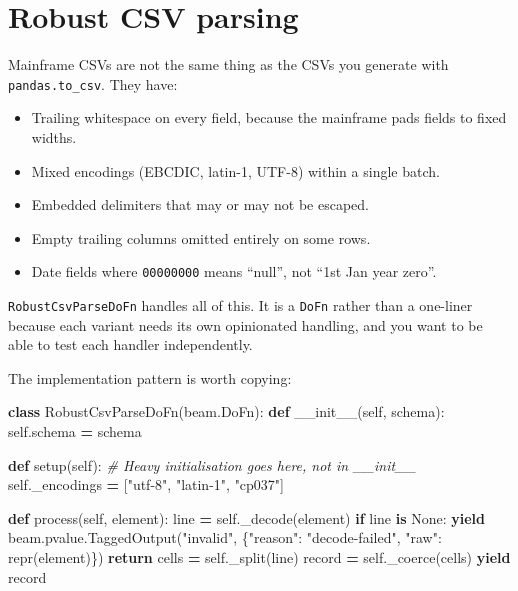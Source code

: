 \documentclass[
  11pt,
  british,
  oneside]{book}
\newenvironment{Shaded}{\begin{snugshade}}{\end{snugshade}}
\newcommand{\BuiltInTok}[1]{#1}
\newcommand{\CommentTok}[1]{\textcolor[rgb]{0.56,0.35,0.01}{\textit{#1}}}
\newcommand{\ControlFlowTok}[1]{\textcolor[rgb]{0.13,0.29,0.53}{\textbf{#1}}}
\newcommand{\FunctionTok}[1]{\textcolor[rgb]{0.00,0.00,0.00}{#1}}
\newcommand{\KeywordTok}[1]{\textcolor[rgb]{0.13,0.29,0.53}{\textbf{#1}}}
\newcommand{\NormalTok}[1]{#1}
\newcommand{\OperatorTok}[1]{\textcolor[rgb]{0.81,0.36,0.00}{\textbf{#1}}}
\newcommand{\StringTok}[1]{\textcolor[rgb]{0.31,0.60,0.02}{#1}}
\newcommand{\VariableTok}[1]{\textcolor[rgb]{0.00,0.00,0.00}{#1}}
\providecommand{\tightlist}{%
  \setlength{\itemsep}{0pt}\setlength{\parskip}{0pt}}
\begin{document}
\hypertarget{robust-csv-parsing}{%
\section{Robust CSV parsing}\label{robust-csv-parsing}}

Mainframe CSVs are not the same thing as the CSVs you generate with
\texttt{pandas.to\_csv}. They have:

\begin{itemize}
\tightlist
\item
  Trailing whitespace on every field, because the mainframe pads fields
  to fixed widths.
\item
  Mixed encodings (EBCDIC, latin-1, UTF-8) within a single
  batch.
\item
  Embedded delimiters that may or may not be escaped.
\item
  Empty trailing columns omitted entirely on some rows.
\item
  Date fields where \texttt{00000000} means ``null'', not ``1st Jan year
  zero''.
\end{itemize}

\texttt{RobustCsvParseDoFn} handles all of this. It is a \texttt{DoFn}
rather than a one-liner because each variant needs its own opinionated
handling, and you want to be able to test each handler independently.

The implementation pattern is worth copying:

\begin{Shaded}
\begin{Highlighting}[]
\KeywordTok{class}\NormalTok{ RobustCsvParseDoFn(beam.DoFn):}
    \KeywordTok{def} \FunctionTok{\_\_init\_\_}\NormalTok{(}\VariableTok{self}\NormalTok{, schema):}
        \VariableTok{self}\NormalTok{.schema }\OperatorTok{=}\NormalTok{ schema}

    \KeywordTok{def}\NormalTok{ setup(}\VariableTok{self}\NormalTok{):}
        \CommentTok{\# Heavy initialisation goes here, not in \_\_init\_\_}
        \VariableTok{self}\NormalTok{.\_encodings }\OperatorTok{=}\NormalTok{ [}\StringTok{"utf{-}8"}\NormalTok{, }\StringTok{"latin{-}1"}\NormalTok{, }\StringTok{"cp037"}\NormalTok{]}

    \KeywordTok{def}\NormalTok{ process(}\VariableTok{self}\NormalTok{, element):}
\NormalTok{        line }\OperatorTok{=} \VariableTok{self}\NormalTok{.\_decode(element)}
        \ControlFlowTok{if}\NormalTok{ line }\KeywordTok{is} \VariableTok{None}\NormalTok{:}
            \ControlFlowTok{yield}\NormalTok{ beam.pvalue.TaggedOutput(}\StringTok{"invalid"}\NormalTok{, \{}\StringTok{"reason"}\NormalTok{: }\StringTok{"decode{-}failed"}\NormalTok{, }\StringTok{"raw"}\NormalTok{: }\BuiltInTok{repr}\NormalTok{(element)\})}
            \ControlFlowTok{return}
\NormalTok{        cells }\OperatorTok{=} \VariableTok{self}\NormalTok{.\_split(line)}
\NormalTok{        record }\OperatorTok{=} \VariableTok{self}\NormalTok{.\_coerce(cells)}
        \ControlFlowTok{yield}\NormalTok{ record}
\end{Highlighting}
\end{Shaded}
\end{document}
